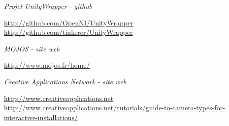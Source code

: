 \begin{thebibliography}{200}
\begin{footnotesize}
  \emph{Projet UnityWrapper - github}\\
  \begin{tiny}
  \url{http://github.com/OpenNI/UnityWrapper}\\
  \url{http://github.com/tinkerer/UnityWrapper}
  \end{tiny}
  
  \emph{MOJOS - site web}\\
  \begin{tiny}
  \url{http://www.mojos.fr/home/}
  \end{tiny}

  \emph{Creative Applications Network - site web}\\
  \begin{tiny}
  \url{http://www.creativeapplications.net}
  \url{http://www.creativeapplications.net/tutorials/guide-to-camera-types-for-interactive-installations/}
  \end{tiny}
  
\end{footnotesize}
\end{thebibliography}
